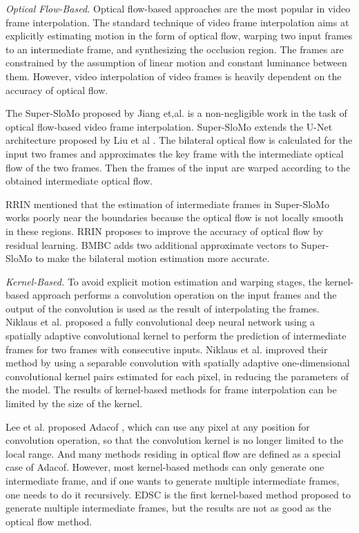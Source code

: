 \documentclass{article}
\begin{document}
\textit{Optical Flow-Based.}
Optical flow-based approaches are the most popular in video frame interpolation.
The standard technique of video frame interpolation aims at explicitly estimating motion in the form of optical flow, warping two input frames to an intermediate frame, and synthesizing the occlusion region. The frames are constrained by the assumption of linear motion and constant luminance between them.
However, video interpolation of video frames is heavily dependent on the accuracy of optical flow.

The Super-SloMo \cite{jiang2018super} proposed by Jiang et,al. is a non-negligible work in the task of optical flow-based video frame interpolation.
Super-SloMo extends the U-Net architecture proposed by Liu et al \cite{liu2017video}.
The bilateral optical flow is calculated for the input two frames and approximates the key frame with the intermediate optical flow of the two frames.
Then the frames of the input are warped according to the obtained intermediate optical flow.

RRIN \cite{li2020video} mentioned that the estimation of intermediate frames in Super-SloMo works poorly near the boundaries because the optical flow is not locally smooth in these regions.
RRIN proposes to improve the accuracy of optical flow by residual learning.
BMBC \cite{park2020bmbc} adds two additional approximate vectors to Super-SloMo to make the bilateral motion estimation more accurate.


\textit{Kernel-Based.}
To avoid explicit motion estimation and warping stages, the kernel-based approach performs a convolution operation on the input frames and the output of the convolution is used as the result of interpolating the frames.
Niklaus et al. \cite{niklaus2017video1} proposed a fully convolutional deep neural network using a spatially adaptive convolutional kernel to perform the prediction of intermediate frames for two frames with consecutive inputs.
Niklaus et al. \cite{niklaus2017video2} improved their method by using a separable convolution with spatially adaptive one-dimensional convolutional kernel pairs estimated for each pixel, in reducing the parameters of the model.
The results of kernel-based methods for frame interpolation can be limited by the size of the kernel.

Lee et al. proposed Adacof \cite{lee2020adacof}, which can use any pixel at any position for convolution operation,
so that the convolution kernel is no longer limited to the local range.
And many methods residing in optical flow are defined as a special case of Adacof.
However, most kernel-based methods can only generate one intermediate frame, and if one wants to generate multiple intermediate frames, one needs to do it recursively.
EDSC \cite{cheng2021multiple} is the first kernel-based method proposed to generate multiple intermediate frames, but the results are not as good as the optical flow method.
\end{document}
